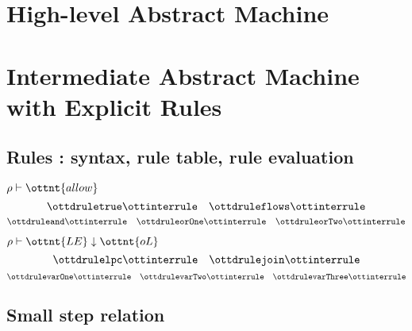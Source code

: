 \documentclass{article}
\begin{document}

\newpage
\section*{High-level Abstract Machine}

\ottdefnsAbstractHighLevelSmallStep


\newpage
\section*{Intermediate Abstract Machine
  with Explicit Rules}

\subsection*{Rules : syntax, rule table, rule evaluation}

\ottgrammartabular{
\ottLE\ottinterrule
\ottBE\ottinterrule
\ottRHS\ottinterrule
\ottrho\ottinterrule
}

\ottfundefnsRule

\begin{ottdefnblock}[#1]{$ \rho  \vdash   \ottnt{allow} $}{}
\[ \ottdruletrue \ottinterrule
   \quad \ottdruleflows\ottinterrule \]
\[ \ottdruleand\ottinterrule 
   \quad \ottdruleorOne\ottinterrule
   \quad \ottdruleorTwo\ottinterrule \]
\end{ottdefnblock}

\clearpage
\begin{ottdefnblock}[#1]{$ \rho  \vdash \ottnt{LE} \downarrow  \ottnt{oL} $}{}
\small 
\[ \ottdrulelpc \ottinterrule
   \quad \ottdrulejoin \ottinterrule \]
\[ \ottdrulevarOne \ottinterrule
   \quad \ottdrulevarTwo \ottinterrule
   \quad \ottdrulevarThree \ottinterrule \]
\end{ottdefnblock}

\ottdefnrunXXtmr

\clearpage

\subsection*{Small step relation}

\ottdefnsAbstractExplicitSmallStep
\end{document}
